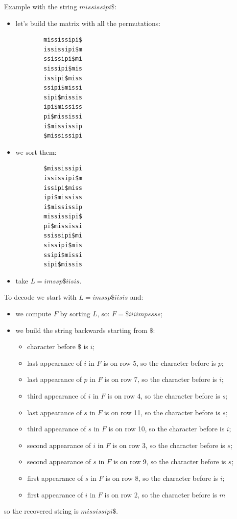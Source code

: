 Example with the string $mississipi\$$:
\begin{itemize}
    \item let's build the matrix with all the permutations:
    \begin{verbatim}
        mississipi$
        ississipi$m
        ssissipi$mi
        sissipi$mis
        issipi$miss
        ssipi$missi
        sipi$missis
        ipi$mississ
        pi$mississi
        i$mississip
        $mississipi
    \end{verbatim}

    \item we sort them:
    \begin{verbatim}
        $mississipi        
        ississipi$m
        issipi$miss
        ipi$mississ
        i$mississip
        mississipi$
        pi$mississi
        ssissipi$mi
        sissipi$mis
        ssipi$missi
        sipi$missis
    \end{verbatim}

    \item take $L = imssp\$iisis$.
\end{itemize}

To decode we start with $L = imssp\$iisis$ and:
\begin{itemize}
    \item we compute $F$ by sorting $L$, so: $F = \$iiiimpssss$;
    \item we build the string backwards starting from $\$$:
    \begin{itemize}
        \item character before $\$$ is $i$;
        \item last appearance of $i$ in $F$ is on row 5, so the character before is $p$;
        \item last appearance of $p$ in $F$ is on row 7, so the character before is $i$;
        \item third appearance of $i$ in $F$ is on row 4, so the character before is $s$;
        \item last appearance of $s$ in $F$ is on row 11, so the character before is $s$;
        \item third appearance of $s$ in $F$ is on row 10, so the character before is $i$;
        \item second appearance of $i$ in $F$ is on row 3, so the character before is $s$;
        \item second appearance of $s$ in $F$ is on row 9, so the character before is $s$;
        \item first appearance of $s$ in $F$ is on row 8, so the character before is $i$;
        \item first appearance of $i$ in $F$ is on row 2, so the character before is $m$
    \end{itemize}
\end{itemize}
so the recovered string is $mississipi\$$.

